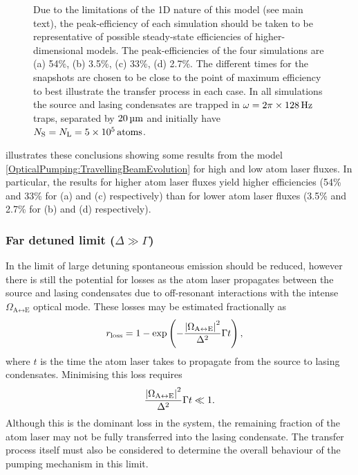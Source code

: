 \begin{figure}
{    Due to the limitations of the 1D nature of this model (see main text), the peak-efficiency of each simulation should be taken to be representative of possible steady-state efficiencies of higher-dimensional models.  The peak-efficiencies of the four simulations are (a) 54\%, (b) 3.5\%, (c) 33\%, (d) 2.7\%.
The different times for the snapshots are chosen to be close to the point of maximum efficiency to best illustrate the transfer process in each case.
    In all simulations the source and lasing condensates are trapped in $\omega = 2 \pi \times \unit[128]{Hz}$ traps, separated by $\unit[20]{\micro m}$ and initially have $N_\text{S} = N_\text{L} = 5 \times \unit[10^5]{atoms}$.
}
    \label{OpticalPumping:TravellingBeamZeroDetuningResults}
\end{figure}

 illustrates these conclusions showing some results from the model \eqref{OpticalPumping:TravellingBeamEvolution} for high and low atom laser fluxes.  In particular, the results for higher atom laser fluxes yield higher efficiencies (54\% and 33\% for (a) and (c) respectively) than for lower atom laser fluxes (3.5\% and 2.7\% for (b) and (d) respectively).


\subsubsection{Far detuned limit ($\Delta \gg \Gamma$)}

In the limit of large detuning spontaneous emission should be reduced, however there is still the potential for losses as the atom laser propagates between the source and lasing condensates due to off-resonant interactions with the intense $\Omega_{\text{A} \leftrightarrow \text{E}}$ optical mode.  These losses may be estimated fractionally as
\begin{align}
    r_\text{loss} &= 1 - \exp\left( - \frac{\abs{\Omega_{\text{A} \leftrightarrow \text{E}}}^2}{\Delta^2} \Gamma t \right), \label{OpticalPumping:TravellingBeam:FarDetuned:PropagationLoss}
\end{align}
where $t$ is the time the atom laser takes to propagate from the source to lasing condensates.  Minimising this loss requires
\begin{align}
    \frac{\abs{\Omega_{\text{A} \leftrightarrow \text{E}}}^2}{\Delta^2} \Gamma t \ll 1. \label{OpticalPumping:TravellingBeam:FarDetuned:MinimalPropagationLossRequirement}
\end{align}
Although this is the dominant loss in the system, the remaining fraction of the atom laser may not be fully transferred into the lasing condensate.  The transfer process itself must also be considered to determine the overall behaviour of the pumping mechanism in this limit.

